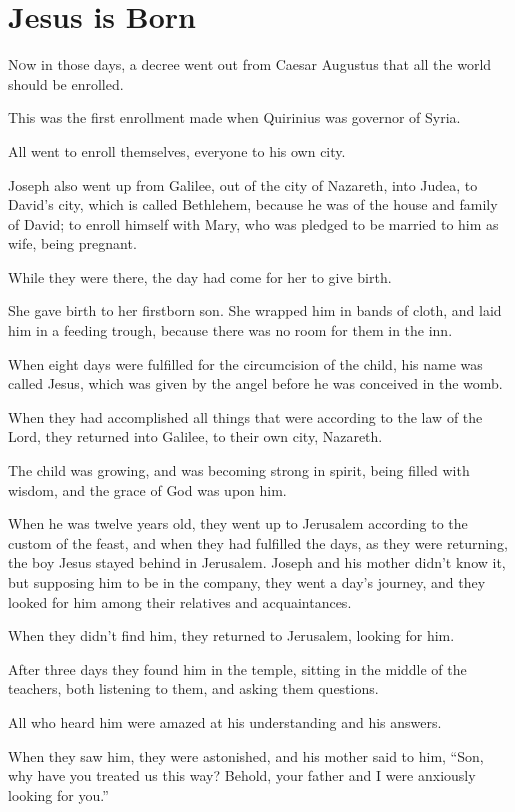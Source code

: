 \sloppy
\clearpage \section*{Jesus is Born}
\chapterornament

\lettrine{N}ow in those days, a decree went out from Caesar Augustus that all the world should be enrolled.

This was the first enrollment made when Quirinius was governor of Syria.

All went to enroll themselves, everyone to his own city.

Joseph also went up from Galilee, out of the city of Nazareth, into Judea, to David’s city, which is called Bethlehem, because he was of the house and family of David; to enroll himself with Mary, who was pledged to be married to him as wife, being pregnant.

While they were there, the day had come for her to give birth.

She gave birth to her firstborn son. She wrapped him in bands of cloth, and laid him in a feeding trough, because there was no room for them in the inn.

When eight days were fulfilled for the circumcision of the child, his name was called Jesus, which was given by the angel before he was conceived in the womb.

When they had accomplished all things that were according to the law of the Lord, they returned into Galilee, to their own city, Nazareth.

The child was growing, and was becoming strong in spirit, being filled with wisdom, and the grace of God was upon him.

When he was twelve years old, they went up to Jerusalem according to the custom of the feast, and when they had fulfilled the days, as they were returning, the boy Jesus stayed behind in Jerusalem. Joseph and his mother didn’t know it, but supposing him to be in the company, they went a day’s journey, and they looked for him among their relatives and acquaintances.

When they didn’t find him, they returned to Jerusalem, looking for him.

After three days they found him in the temple, sitting in the middle of the teachers, both listening to them, and asking them questions.

All who heard him were amazed at his understanding and his answers.

When they saw him, they were astonished, and his mother said to him, “Son, why have you treated us this way? Behold, your father and I were anxiously looking for you.”

